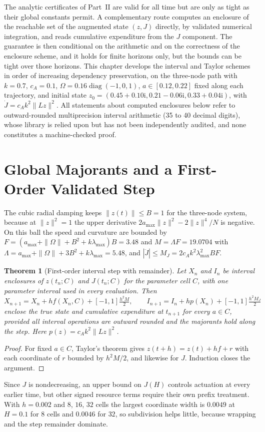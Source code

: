 \documentclass[11pt,notitlepage]{report}
\newtheorem{theorem}{Theorem}[chapter]
\theoremstyle{definition}
\theoremstyle{remark}
\newcommand{\ii}{\mathrm i}
\begin{document}
The analytic certificates of Part~II are valid for all time but are only as tight as their global constants permit. A complementary route computes an enclosure of the reachable set of the augmented state $(z,J)$ directly, by validated numerical integration, and reads cumulative expenditure from the $J$ component. The guarantee is then conditional on the arithmetic and on the correctness of the enclosure scheme, and it holds for finite horizons only, but the bounds can be tight over those horizons. This chapter develops the interval and Taylor schemes in order of increasing dependency preservation, on the three-node path with $k=0.7$, $c_A=0.1$, $\Omega=0.16\operatorname{diag}(-1,0,1)$, $a\in[0.12,0.22]$ fixed along each trajectory, and initial state $z_0=(0.45+0.10\ii,0.21-0.06\ii,0.33+0.04\ii)$, with $\dot J=c_Ak^2\|Lz\|^2$. All statements about computed enclosures below refer to outward-rounded multiprecision interval arithmetic (35 to 40 decimal digits), whose library is relied upon but has not been independently audited, and none constitutes a machine-checked proof.

\section{Global Majorants and a First-Order Validated Step}
The cubic radial damping keeps $\|z(t)\|\le B=1$ for the three-node system, because at $\|z\|^2=1$ the upper derivative $2a_{\max}\|z\|^2-2\|z\|^4/N$ is negative. On this ball the speed and curvature are bounded by $F=(a_{\max}+\|\Omega\|+B^2+k\lambda_{\max})B=3.48$ and $M=\Lambda F=19.0704$ with $\Lambda=a_{\max}+\|\Omega\|+3B^2+k\lambda_{\max}=5.48$, and $|\ddot J|\le M_J=2c_Ak^2\lambda_{\max}^2BF$.
\begin{theorem}[First-order interval step with remainder]\label{th:firstorder}
Let $X_n$ and $I_n$ be interval enclosures of $z(t_n;C)$ and $J(t_n;C)$ for the parameter cell $C$, with one parameter interval used in every evaluation. Then
\[
X_{n+1}=X_n+hf(X_n,C)+[-1,1]\tfrac{h^2M}2,\qquad I_{n+1}=I_n+hp(X_n)+[-1,1]\tfrac{h^2M_J}2
\]
enclose the true state and cumulative expenditure at $t_{n+1}$ for every $a\in C$, provided all interval operations are outward rounded and the majorants hold along the step. Here $p(z)=c_Ak^2\|Lz\|^2$.
\end{theorem}
\begin{proof}
For fixed $a\in C$, Taylor's theorem gives $z(t+h)=z(t)+hf+r$ with each coordinate of $r$ bounded by $h^2M/2$, and likewise for $J$. Induction closes the argument.
\end{proof}
Since $J$ is nondecreasing, an upper bound on $J(H)$ controls actuation at every earlier time, but other signed resource terms require their own prefix treatment. With $h=0.002$ and $8$, $16$, $32$ cells the largest coordinate width is $0.0049$ at $H=0.1$ for $8$ cells and $0.0046$ for $32$, so subdivision helps little, because wrapping and the step remainder dominate.
\end{document}
